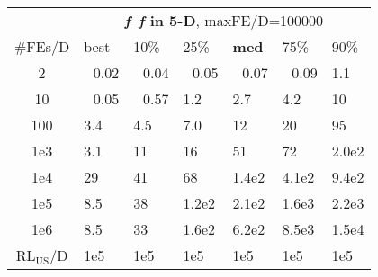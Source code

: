 \begin{tabular}{c|llllll}
 & \multicolumn{6}{|c}{\textbf{\textit{f}\raisebox{-0.35ex}{1}--\textit{f}\raisebox{-0.35ex}{24} in 5-D}, maxFE/D=100000}\\
\#FEs/D & best & 10\% & 25\% & \textbf{med} & 75\% & 90\%\\
2 & ~\,0.02 & ~\,0.04 & ~\,0.05 & ~\,0.07 & ~\,0.09 & \hspace*{1ex}1.1\\
10 & ~\,0.05 & ~\,0.57 & \hspace*{1ex}1.2 & \hspace*{1ex}2.7 & \hspace*{1ex}4.2 & 10\\
100 & \hspace*{1ex}3.4 & \hspace*{1ex}4.5 & \hspace*{1ex}7.0 & 12 & 20 & 95\\
1e3 & \hspace*{1ex}3.1 & 11 & 16 & 51 & 72 & 2.0e2\\
1e4 & 29 & 41 & 68 & 1.4e2 & 4.1e2 & 9.4e2\\
1e5 & \hspace*{1ex}8.5 & 38 & 1.2e2 & 2.1e2 & 1.6e3 & 2.2e3\\
1e6 & \hspace*{1ex}8.5 & 33 & 1.6e2 & 6.2e2 & 8.5e3 & 1.5e4\\
$\text{RL}_{\text{US}}$/D & 1e5 & 1e5 & 1e5 & 1e5 & 1e5 & 1e5
\end{tabular}
